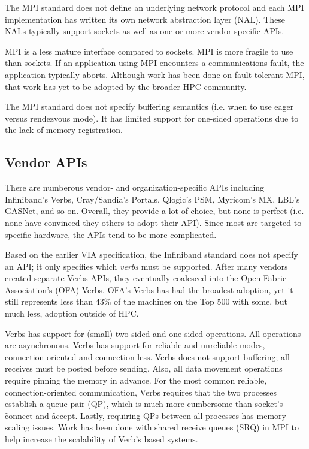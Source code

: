 \documentclass[conference]{IEEEtran}
\begin{document}
The MPI standard does not define an underlying network protocol and each MPI
implementation has written its own network abstraction layer (NAL). These NALs typically
support sockets as well as one or more vendor specific APIs.

MPI is a less mature interface compared to sockets. MPI is more fragile to use than
sockets. If an application using MPI encounters a communications fault, the application
typically aborts. Although work has been done on fault-tolerant MPI\cite{ft-mpi, mpi-ft},
that work has yet to be adopted by the broader HPC community.

The MPI standard does not specify buffering semantics (i.e. when to use eager versus
rendezvous mode). It has limited support for one-sided operations due to the lack of
memory registration.

\subsection{Vendor APIs} There are numberous vendor- and organization-specific APIs
including Infiniband's Verbs\cite{ofa-verbs}, Cray/Sandia's Portals\cite{portals}, Qlogic's
PSM\cite{psm}, Myricom's MX\cite{mx}, LBL's GASNet\cite{gasnet}, and so on.  Overall, they
provide a lot of choice, but none is perfect (i.e. none have convinced they others to
adopt their API).  Since most are targeted to specific hardware, the APIs tend to be more
complicated.

Based on the earlier VIA specification\cite{via}, the Infiniband standard does not specify
an API; it only specifies which \emph{verbs} must be supported. After many vendors created
separate Verbs APIs, they eventually coalesced into the Open Fabric Association's (OFA)
Verbs. OFA's Verbs has had the broadest adoption, yet it still represents less than 43\%
of the machines on the Top 500\cite{top500} with some, but much less, adoption outside of
HPC.

Verbs has support for (small) two-sided and one-sided operations. All operations are
asynchronous. Verbs has support for reliable and unreliable modes, connection-oriented
and connection-less. Verbs does not support buffering; all receives must be posted before
sending. Also, all data movement operations require pinning the memory in advance. For the
most common reliable, connection-oriented communication, Verbs requires that the two
processes establish a queue-pair (QP), which is much more cumbersome than socket's
\f{connect} and \f{accept}. Lastly, requiring QPs between all processes has memory scaling
issues. Work has been done with shared receive queues (SRQ) in MPI\cite{srq} to help
increase the scalability of Verb's based systems.
\end{document}
